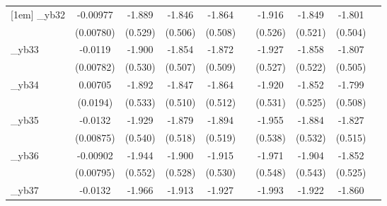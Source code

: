 \begin{table}[htbp]
\begin{tabular}{l*{9}{c}}
[1em]
\_yb32       &    -0.00977         &      -1.889\sym{***}&      -1.846\sym{***}&      -1.864\sym{***}&                     &      -1.916\sym{***}&      -1.849\sym{***}&      -1.801\sym{***}&                     \\
            &   (0.00780)         &     (0.529)         &     (0.506)         &     (0.508)         &                     &     (0.526)         &     (0.521)         &     (0.504)         &                     \\
[1em]
\_yb33       &     -0.0119         &      -1.900\sym{***}&      -1.854\sym{***}&      -1.872\sym{***}&                     &      -1.927\sym{***}&      -1.858\sym{***}&      -1.807\sym{***}&                     \\
            &   (0.00782)         &     (0.530)         &     (0.507)         &     (0.509)         &                     &     (0.527)         &     (0.522)         &     (0.505)         &                     \\
[1em]
\_yb34       &     0.00705         &      -1.892\sym{***}&      -1.847\sym{***}&      -1.864\sym{***}&                     &      -1.920\sym{***}&      -1.852\sym{***}&      -1.799\sym{***}&                     \\
            &    (0.0194)         &     (0.533)         &     (0.510)         &     (0.512)         &                     &     (0.531)         &     (0.525)         &     (0.508)         &                     \\
[1em]
\_yb35       &     -0.0132         &      -1.929\sym{***}&      -1.879\sym{***}&      -1.894\sym{***}&                     &      -1.955\sym{***}&      -1.884\sym{***}&      -1.827\sym{***}&                     \\
            &   (0.00875)         &     (0.540)         &     (0.518)         &     (0.519)         &                     &     (0.538)         &     (0.532)         &     (0.515)         &                     \\
[1em]
\_yb36       &    -0.00902         &      -1.944\sym{***}&      -1.900\sym{***}&      -1.915\sym{***}&                     &      -1.971\sym{***}&      -1.904\sym{***}&      -1.852\sym{***}&                     \\
            &   (0.00795)         &     (0.552)         &     (0.528)         &     (0.530)         &                     &     (0.548)         &     (0.543)         &     (0.525)         &                     \\
[1em]
\_yb37       &     -0.0132         &      -1.966\sym{***}&      -1.913\sym{***}&      -1.927\sym{***}&                     &      -1.993\sym{***}&      -1.922\sym{***}&      -1.860\sym{***}&                     \\

\end{tabular}
\end{table}
